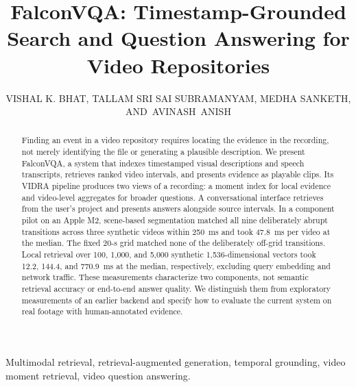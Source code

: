 \documentclass{ieeeaccess}
\begin{document}

\title{FalconVQA: Timestamp-Grounded Search and Question Answering for Video Repositories}
\author{VISHAL K. BHAT,
TALLAM SRI SAI SUBRAMANYAM,
MEDHA SANKETH, \mbox{AND AVINASH ANISH}}
\address[1]{Department of Computer Science and Engineering, RV College of Engineering, Bengaluru 560059, India}
\address[2]{Department of Information Science and Engineering, RV College of Engineering, Bengaluru 560059, India}

\begin{abstract}
Finding an event in a video repository requires locating the evidence in the recording, not merely identifying the file or generating a plausible description. We present FalconVQA, a system that indexes timestamped visual descriptions and speech transcripts, retrieves ranked video intervals, and presents evidence as playable clips. Its VIDRA pipeline produces two views of a recording: a moment index for local evidence and video-level aggregates for broader questions. A conversational interface retrieves from the user's project and presents answers alongside source intervals. In a component pilot on an Apple M2, scene-based segmentation matched all nine deliberately abrupt transitions across three synthetic videos within 250~ms and took 47.8~ms per video at the median. The fixed 20-s grid matched none of the deliberately off-grid transitions. Local retrieval over 100, 1,000, and 5,000 synthetic 1,536-dimensional vectors took 12.2, 144.4, and 770.9~ms at the median, respectively, excluding query embedding and network traffic. These measurements characterize two components, not semantic retrieval accuracy or end-to-end answer quality. We distinguish them from exploratory measurements of an earlier backend and specify how to evaluate the current system on real footage with human-annotated evidence.
\end{abstract}

\begin{keywords}
Multimodal retrieval, retrieval-augmented generation, temporal grounding, video moment retrieval, video question answering.
\end{keywords}

\titlepgskip=-15pt
\maketitle
\pagestyle{headings}
\end{document}
